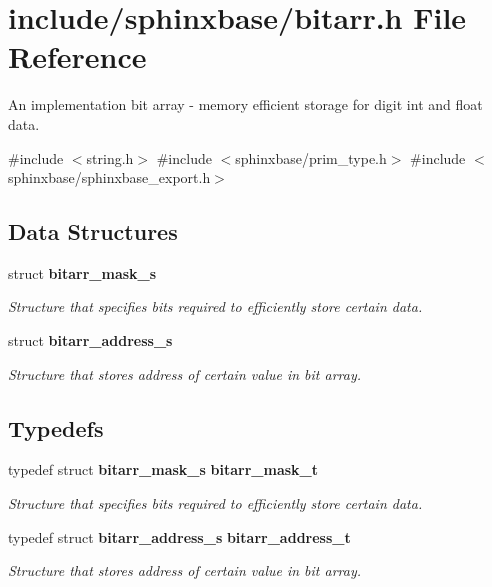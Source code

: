 \section{include/sphinxbase/bitarr.h File Reference}
\label{bitarr_8h}


An implementation bit array -\/ memory efficient storage for digit int and float data.  


{\ttfamily \#include $<$string.\+h$>$}\newline
{\ttfamily \#include $<$sphinxbase/prim\+\_\+type.\+h$>$}\newline
{\ttfamily \#include $<$sphinxbase/sphinxbase\+\_\+export.\+h$>$}\newline
\subsection*{Data Structures}
\begin{DoxyCompactItemize}
\item 
struct \textbf{ bitarr\+\_\+mask\+\_\+s}
\begin{DoxyCompactList}\small\item\em Structure that specifies bits required to efficiently store certain data. \end{DoxyCompactList}\item 
struct \textbf{ bitarr\+\_\+address\+\_\+s}
\begin{DoxyCompactList}\small\item\em Structure that stores address of certain value in bit array. \end{DoxyCompactList}\end{DoxyCompactItemize}
\subsection*{Typedefs}
\begin{DoxyCompactItemize}
\item 
\mbox{\label{bitarr_8h_aec70f3bbe9a6e403fb371ae467f71ad7}} 
typedef struct \textbf{ bitarr\+\_\+mask\+\_\+s} \textbf{ bitarr\+\_\+mask\+\_\+t}
\begin{DoxyCompactList}\small\item\em Structure that specifies bits required to efficiently store certain data. \end{DoxyCompactList}\item 
\mbox{\label{bitarr_8h_a45f2491b4de7575350b30cd599e4555f}} 
typedef struct \textbf{ bitarr\+\_\+address\+\_\+s} \textbf{ bitarr\+\_\+address\+\_\+t}
\begin{DoxyCompactList}\small\item\em Structure that stores address of certain value in bit array. \end{DoxyCompactList}\end{DoxyCompactItemize}
